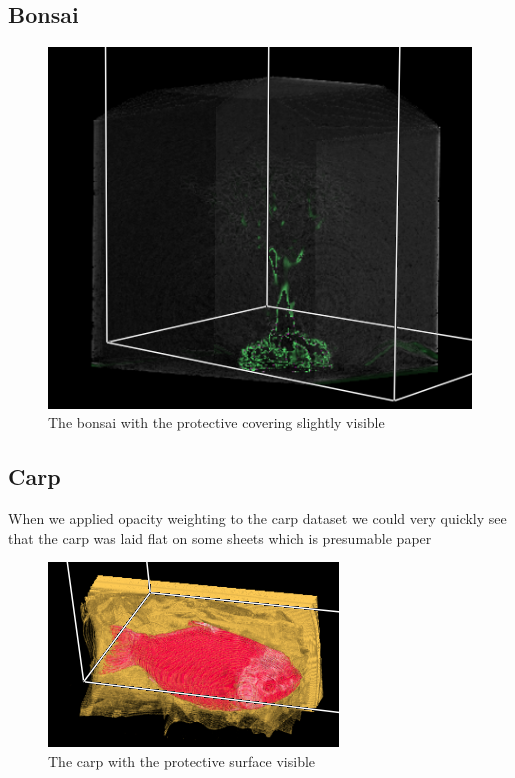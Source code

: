 \documentclass[a4paper,twoside,11pt]{article}
\begin{document}
 \subsection{Bonsai}
  \begin{figure}[h]
 \centering
 \includegraphics[scale=0.6]{images/bonsaiOp}
 \caption{The bonsai with the protective covering slightly visible}
 \label{carpOp}
 \end{figure}
 
 \subsection{Carp}
 When we applied opacity weighting to the carp dataset we could very quickly see that the carp was laid flat on some sheets which is presumable paper
 \begin{figure}[h]
 \centering
 \includegraphics{images/carpOp}
 \caption{The carp with the protective surface visible}
 \label{carpOp}
 \end{figure}
 
\end{document}
